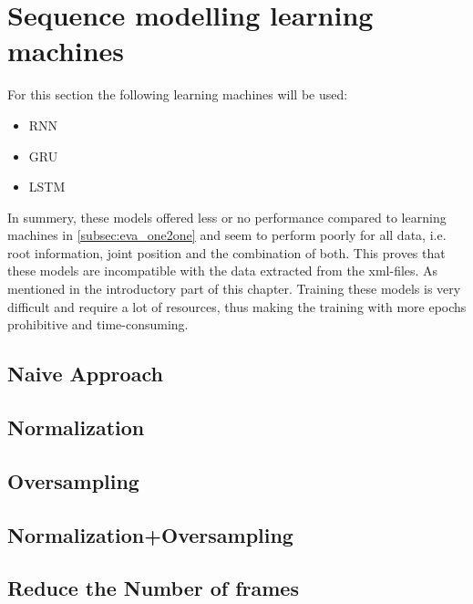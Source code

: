 	\section{Sequence modelling learning machines}
		For this section the following learning machines will be used:
		\begin{itemize}
			\item RNN
			\item GRU
			\item LSTM
		\end{itemize}
		In summery, these models offered less or no performance compared to learning machines in \ref{subsec:eva_one2one} and seem to perform poorly for all data, i.e. root information, joint position and the combination of both. This proves that these models are incompatible with the data extracted from the xml-files. As mentioned in the introductory part of this chapter. Training these models is very difficult and require a lot of resources, thus making the training with more epochs prohibitive and time-consuming. 
		\subsection{Naive Approach}
		\subsection{Normalization}
		\subsection{Oversampling}
		\subsection{Normalization+Oversampling}
		\subsection{Reduce the Number of frames}
